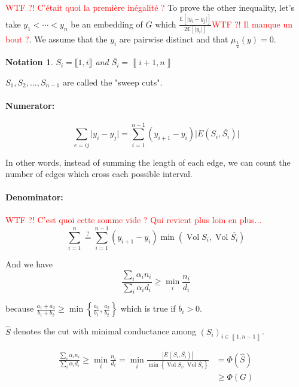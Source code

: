 \documentclass[12pt]{article}
\newtheorem{notation}{Notation}
\newcommand{\EE}{\mathbb{E}}
\newcommand{\set}[1]{\left\{ #1 \right\}}
\newcommand{\brackets}[1]{\left\llbracket #1 \right\rrbracket}
\newcommand{\wtf}[1]{\Huge\textcolor{red}{WTF ?! #1}\normalsize}
\newcommand{\card}[1]{\left\lvert#1\right\rvert}
\newcommand{\esp}[2][]{\underset{#1}{\EE}\left[ #2 \right]}
\DeclareMathOperator{\vol}{Vol}
\begin{document}
\bigskip

\wtf{C'était quoi la première inégalité ?}
To prove the other inequality, let's take $y_1 < \cdots < y_n$ be an embedding of $G$ which $\frac{\esp{\lvert y_i-y_j\rvert}}{2\esp{\lvert y_i \rvert}}$\wtf{Il manque un bout ?}. We assume that the $y_i$ are pairwise distinct and that $\mu_{\frac{1}{2}}(y) = 0$.


\begin{notation}
    $S_i = \llbracket 1,i \rrbracket$ and $\overline{S_i} = \brackets{i+1,n}$
\end{notation}

$S_1, S_2,\ldots, S_{n-1}$ are called the "sweep cuts".

\paragraph{Numerator:}

\[
    \sum\limits_{e=ij} \lvert y_i-y_j \rvert = \sum\limits_{i=1}^{n-1} (y_{i+1} - y_i) \lvert E(S_i, \overline{S_i}) \rvert
\]

In other words, instead of summing the length of each edge, we can count the number of edges which cross each possible interval. 

\paragraph{Denominator:}

\wtf{C'est quoi cette somme vide ? Qui revient plus loin en plus...}
\[
    \sum\limits_{i=1}^n \overset{?}{=} \sum\limits_{i=1}^{n-1} (y_{i+1} - y_i) \min(\vol S_i, \vol \overline{S_i})
\]

And we have
\[
    \frac{\sum\limits_i \alpha_i n_i}{\sum\limits_i \alpha_i d_i} \geqslant \min\limits_i \frac{n_i}{d_i}
\]

because $\frac{a_1+a_2}{b_1+b_2} \geqslant \min\set{\frac{a_1}{b_1},\frac{a_2}{b_2}}$ which is true if $b_i > 0$.


$\widehat{S}$ denotes the cut with minimal conductance among $(S_i)_{i\in\brackets{1,n-1}}$.


\[
    \begin{aligned}
        \frac{\sum\limits_i \alpha_i n_i}{\sum\limits_i \alpha_i d_i} \geqslant \min\limits_i \frac{n_i}{d_i} = \min_i \frac{\card{E(S_i,\overline{S_i})}}{\min\set{\vol S_i,\vol \overline{S_i}}} &= \Phi(\widehat{S})\\
        &\geqslant \Phi(G)
    \end{aligned}
\]
\end{document}
